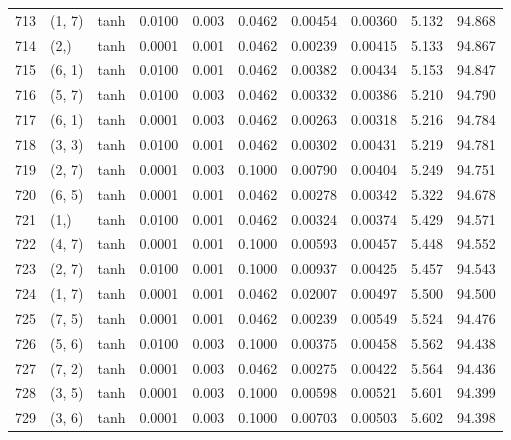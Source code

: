 \begin{tabular}{lllrrrrrrr}
713 &      (1, 7) &      tanh &  0.0100 &  0.003 &  0.0462 &          0.00454 &    0.00360 &       5.132 &    94.868 \\
714 &        (2,) &      tanh &  0.0001 &  0.001 &  0.0462 &          0.00239 &    0.00415 &       5.133 &    94.867 \\
715 &      (6, 1) &      tanh &  0.0100 &  0.001 &  0.0462 &          0.00382 &    0.00434 &       5.153 &    94.847 \\
716 &      (5, 7) &      tanh &  0.0100 &  0.003 &  0.0462 &          0.00332 &    0.00386 &       5.210 &    94.790 \\
717 &      (6, 1) &      tanh &  0.0001 &  0.003 &  0.0462 &          0.00263 &    0.00318 &       5.216 &    94.784 \\
718 &      (3, 3) &      tanh &  0.0100 &  0.001 &  0.0462 &          0.00302 &    0.00431 &       5.219 &    94.781 \\
719 &      (2, 7) &      tanh &  0.0001 &  0.003 &  0.1000 &          0.00790 &    0.00404 &       5.249 &    94.751 \\
720 &      (6, 5) &      tanh &  0.0001 &  0.001 &  0.0462 &          0.00278 &    0.00342 &       5.322 &    94.678 \\
721 &        (1,) &      tanh &  0.0100 &  0.001 &  0.0462 &          0.00324 &    0.00374 &       5.429 &    94.571 \\
722 &      (4, 7) &      tanh &  0.0001 &  0.001 &  0.1000 &          0.00593 &    0.00457 &       5.448 &    94.552 \\
723 &      (2, 7) &      tanh &  0.0100 &  0.001 &  0.1000 &          0.00937 &    0.00425 &       5.457 &    94.543 \\
724 &      (1, 7) &      tanh &  0.0001 &  0.001 &  0.0462 &          0.02007 &    0.00497 &       5.500 &    94.500 \\
725 &      (7, 5) &      tanh &  0.0001 &  0.001 &  0.0462 &          0.00239 &    0.00549 &       5.524 &    94.476 \\
726 &      (5, 6) &      tanh &  0.0100 &  0.003 &  0.1000 &          0.00375 &    0.00458 &       5.562 &    94.438 \\
727 &      (7, 2) &      tanh &  0.0001 &  0.003 &  0.0462 &          0.00275 &    0.00422 &       5.564 &    94.436 \\
728 &      (3, 5) &      tanh &  0.0001 &  0.003 &  0.1000 &          0.00598 &    0.00521 &       5.601 &    94.399 \\
729 &      (3, 6) &      tanh &  0.0001 &  0.003 &  0.1000 &          0.00703 &    0.00503 &       5.602 &    94.398 \\

\end{tabular}
